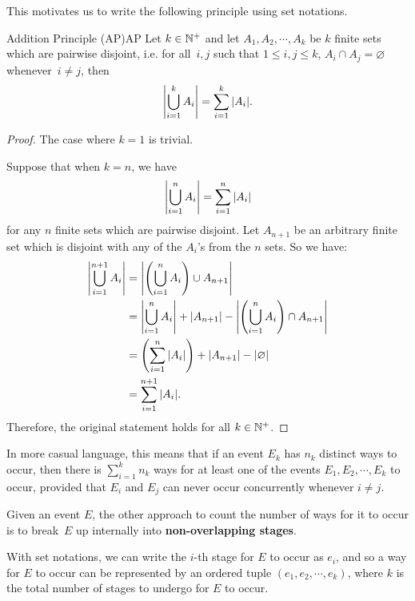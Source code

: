 \documentclass[math]{amznotes}
\theoremstyle{remark}
\begin{document}
This motivates us to write the following principle using set notations.
\begin{thmbox}{Addition Principle (AP)}{AP}
    Let $k \in \mathbb{N}^+$ and let $A_1, A_2, \cdots, A_k$ be $k$ finite sets which are pairwise disjoint, i.e. for all~$i, j$ such that $1 \leq i, j \leq k$, $A_i \cap A_j = \varnothing$ whenever~$i \neq j$, then
   \begin{equation*}
        {\left\lvert {\bigcup_{i = 1}^k A_i} \right\rvert} = \sum_{i = 1}^{k}{\left\lvert {A_i} \right\rvert}.
   \end{equation*} 
   \tcblower
   \begin{proof}
        The case where $k = 1$ is trivial.

        Suppose that when $k = n$, we have
        \begin{equation*}
            {\left\lvert {\bigcup_{i = 1}^n A_i} \right\rvert} = \sum_{i = 1}^{n}{\left\lvert {A_i} \right\rvert}
        \end{equation*} 
        for any $n$ finite sets which are pairwise disjoint. Let $A_{n + 1}$ be an arbitrary finite set which is disjoint with any of the $A_i$'s from the $n$ sets. So we have:
        \begin{align*}
            {\left\lvert {\bigcup_{i = 1}^{n + 1} A_i} \right\rvert} & = {\left\lvert {\left(\bigcup_{i = 1}^n A_i\right) \cup A_{n + 1}} \right\rvert} \\
            & = {\left\lvert {\bigcup_{i = 1}^n A_i} \right\rvert} + {\left\lvert {A_{n + 1}} \right\rvert} - {\left\lvert {\left(\bigcup_{i = 1}^n A_i\right) \cap A_{n + 1}} \right\rvert} \\
            & = \left(\sum_{i = 1}^{n}{\left\lvert {A_i} \right\rvert}\right) + {\left\lvert {A_{n + 1}} \right\rvert} - {\left\lvert {\varnothing} \right\rvert} \\
            & = \sum_{i = 1}^{n + 1}{\left\lvert {A_i} \right\rvert}.
        \end{align*}
        Therefore, the original statement holds for all $k \in \mathbb{N}^+$.
   \end{proof}
\end{thmbox}
\begin{notebox}
    In more casual language, this means that if an event $E_k$ has $n_k$ distinct ways to occur, then there is $\sum_{i = 1}^{k}n_k$ ways for at least one of the events $E_1, E_2, \cdots, E_k$ to occur, provided that $E_i$ and $E_j$ can never occur concurrently whenever $i \neq j$.
\end{notebox}
Given an event $E$, the other approach to count the number of ways for it to occur is to break~$E$ up internally into \textbf{non-overlapping stages}.

With set notations, we can write the $i$-th stage for $E$ to occur as $e_i$, and so a way for $E$ to occur can be represented by an ordered tuple $(e_1, e_2, \cdots, e_k)$, where $k$ is the total number of stages to undergo for $E$ to occur.
\end{document}

